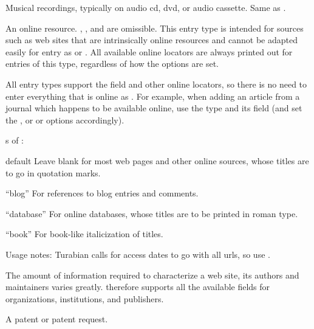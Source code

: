 \documentclass{ltxdockit}[2010/02/12]
\begin{document}
\begin{typelist}
Musical recordings, typically on audio cd, dvd, or audio cassette. Same as .




An online resource. , , and  are omissible. This entry type is intended for sources such as web sites that are intrinsically online resources and cannot be adapted easily for entry as  or . All available online locators are always printed out for entries of this type, regardless of how the options are set.

All entry types support the  field and other online locators, so there is no need to enter everything that is online as . For example, when adding an article from a journal which happens to be available online, use the  type and its  field (and set the , or  or  options accordingly).

s of :
\begin{valuelist}
\item[default] Leave  blank for most web pages and other online sources, whose titles are to go in quotation marks.
\item[``blog''] For references to blog entries and comments.
\item[``database''] For online databases, whose titles are to be printed in roman type.
\item[``book''] For book-like italicization of titles.
\end{valuelist}


Usage notes: Turabian calls for access dates to go with all urls, so use .

The amount of information required to characterize a web site, its authors and maintainers varies greatly.   therefore supports all the available  fields for organizations, institutions, and publishers.



 A patent or patent request. 


\end{typelist}
\end{document}
